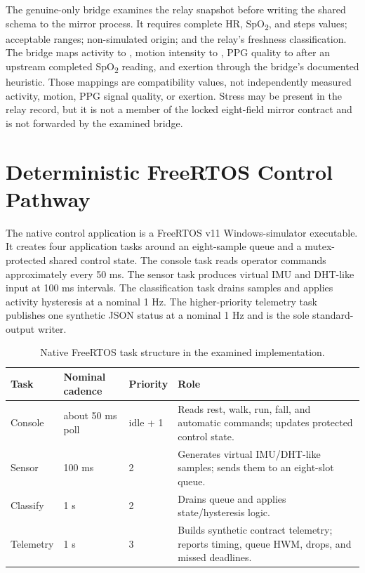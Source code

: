 The genuine-only bridge examines the relay snapshot before writing the shared schema to the mirror process. It requires complete HR, SpO\textsubscript{2}, and steps values; acceptable ranges; non-simulated origin; and the relay's  freshness classification. The bridge maps activity to , motion intensity to , PPG quality to  after an upstream completed SpO\textsubscript{2} reading, and exertion through the bridge's documented heuristic. Those mappings are compatibility values, not independently measured activity, motion, PPG signal quality, or exertion. Stress may be present in the relay record, but it is not a member of the locked eight-field mirror contract and is not forwarded by the examined bridge.

\section{Deterministic FreeRTOS Control Pathway}
The native control application is a FreeRTOS v11 Windows-simulator executable. It creates four application tasks around an eight-sample queue and a mutex-protected shared control state. The console task reads operator commands approximately every 50 ms. The sensor task produces virtual IMU and DHT-like input at 100 ms intervals. The classification task drains samples and applies activity hysteresis at a nominal 1 Hz. The higher-priority telemetry task publishes one synthetic JSON status at a nominal 1 Hz and is the sole standard-output writer.

\begin{table}[H]
\centering
\footnotesize
\renewcommand{\arraystretch}{1.04}
\caption{Native FreeRTOS task structure in the examined implementation.}
\label{tab:rtos-tasks}
\begin{tabularx}{\textwidth}{p{30mm}p{22mm}p{20mm}Y}
\toprule
\textbf{Task} & \textbf{Nominal cadence} & \textbf{Priority} & \textbf{Role}\\
\midrule
Console & about 50 ms poll & idle + 1 & Reads rest, walk, run, fall, and automatic commands; updates protected control state.\\
Sensor & 100 ms & 2 & Generates virtual IMU/DHT-like samples; sends them to an eight-slot queue.\\
Classify & 1 s & 2 & Drains queue and applies state/hysteresis logic.\\
Telemetry & 1 s & 3 & Builds synthetic contract telemetry; reports timing, queue HWM, drops, and missed deadlines.\\
\bottomrule
\end{tabularx}
\end{table}


